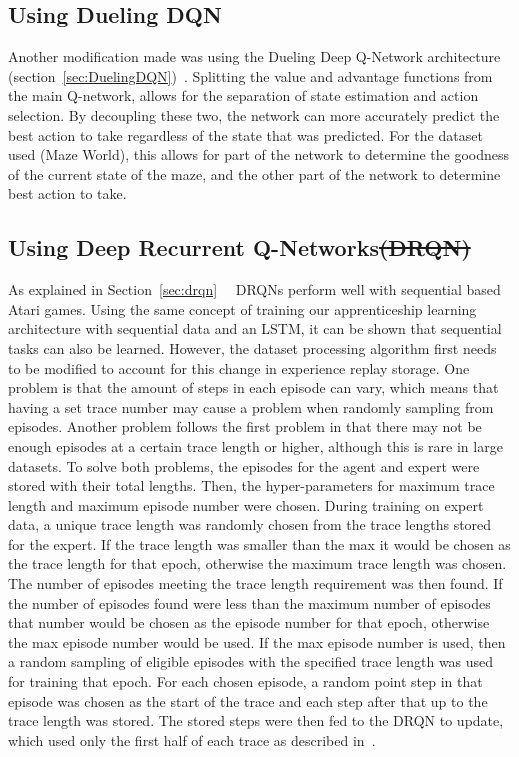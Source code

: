 \documentclass[12pt,american]{report}
\providecommand{\DIFdeltex}[1]{{\protect\color{red}\sout{#1}}}                      %
\providecommand{\DIFdelbegin}{} %
\providecommand{\DIFdelend}{} %
\providecommand{\DIFdel}[1]{\texorpdfstring{\DIFdeltex{#1}}{}} %
\newcommand{\DIFscaledelfig}{0.5}
\newlength{\DIFdelgraphicswidth} %
\newlength{\DIFdelgraphicsheight} %
\newcommand{\DIFdelincludegraphics}[2][]{%
\sbox{\DIFdelgraphicsbox}{\DIFOincludegraphics[#1]{#2}}%
\settoboxwidth{\DIFdelgraphicswidth}{\DIFdelgraphicsbox} %
\settoboxtotalheight{\DIFdelgraphicsheight}{\DIFdelgraphicsbox} %
\scalebox{\DIFscaledelfig}{%
\parbox[b]{\DIFdelgraphicswidth}{\usebox{\DIFdelgraphicsbox}\\[-\baselineskip] \rule{\DIFdelgraphicswidth}{0em}}\llap{\resizebox{\DIFdelgraphicswidth}{\DIFdelgraphicsheight}{%
\setlength{\unitlength}{\DIFdelgraphicswidth}%
\begin{picture}(1,1)%
\thicklines\linethickness{2pt} %
{\color[rgb]{1,0,0}\put(0,0){\framebox(1,1){}}}%
{\color[rgb]{1,0,0}\put(0,0){\line( 1,1){1}}}%
{\color[rgb]{1,0,0}\put(0,1){\line(1,-1){1}}}%
\end{picture}%
}\hspace*{3pt}}} %
} %
\DeclareRobustCommand{\DIFdelbegin}{\DIFOdelbegin \let\includegraphics\DIFdelincludegraphics} %
\DeclareRobustCommand{\DIFdelend}{\DIFOaddend \let\includegraphics\DIFOincludegraphics} %
\begin{document}
\subsection{Using Dueling DQN}
Another modification made was using the Dueling Deep Q-Network architecture (section~\ref{sec:DuelingDQN})~\cite{wang2015dueling}.  Splitting the value and advantage functions from the main Q-network, allows for the separation of state estimation and action selection.  By decoupling these two, the network can more accurately predict the best action to take regardless of the state that was predicted. For the dataset used (Maze World), this allows for part of the network to determine the goodness of the current state of the maze, and the other part of the network to determine best action to take. 

\subsection{Using Deep Recurrent Q-Networks\DIFdelbegin \DIFdel{(DRQN)}\DIFdelend }
\label{sec:drqn-implementation}
As explained in Section~\ref{sec:drqn}~\cite{HausknechtDRQN}~\cite{DBLP:journals/corr/LampleC16} DRQNs perform well with sequential based Atari games. Using the same concept of training our apprenticeship learning architecture with sequential data and an LSTM, it can be shown that sequential tasks can also be learned.  However, the dataset processing algorithm first needs to be modified to account for this change in experience replay storage.  One problem is that the amount of steps in each episode can vary, which means that having a set trace number may cause a problem when randomly sampling from episodes.  Another problem follows the first problem in that there may not be enough episodes at a certain trace length or higher, although this is rare in large datasets.  To solve both problems, the episodes for the agent and expert were stored with their total lengths.  Then, the hyper-parameters for maximum trace length and maximum episode number were chosen.  During training on expert data, a unique trace length was randomly chosen from the trace lengths stored for the expert.  If the trace length was smaller than the max it would be chosen as the trace length for that epoch, otherwise the maximum trace length was chosen.  The number of episodes meeting the trace length requirement was then found.  If the number of episodes found were less than the maximum number of episodes that number would be chosen as the episode number for that epoch, otherwise the max episode number would be used.  If the max episode number is used, then a random sampling of eligible episodes with the specified trace length was used for training that epoch.  For each chosen episode, a random point step in that episode was chosen as the start of the trace and each step after that up to the trace length was stored.  The stored steps were then fed to the DRQN to update, which used only the first half of each trace as described in~\cite{DBLP:journals/corr/LampleC16}.
\end{document}
